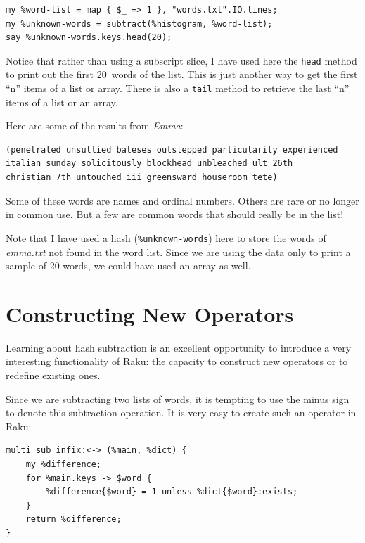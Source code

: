 \begin{verbatim}
my %word-list = map { $_ => 1 }, "words.txt".IO.lines;
my %unknown-words = subtract(%histogram, %word-list);
say %unknown-words.keys.head(20);
\end{verbatim}
%
Notice that rather than using a subscript slice, I have used 
here the {\tt head} method to print out the first 20~words of 
the list. This is just another way to get the first ``n'' items 
of a list or array. There is also a {\tt tail} method to 
retrieve the last ``n'' items of a list or an array.

Here are some of the results from {\em Emma}:

\begin{verbatim}
(penetrated unsullied bateses outstepped particularity experienced 
italian sunday solicitously blockhead unbleached ult 26th 
christian 7th untouched iii greensward houseroom tete)
\end{verbatim}
%
Some of these words are names and ordinal numbers.  Others 
are rare or no longer in common use.  But a few are common
words that should really be in the list!

Note that I have used a hash (\verb'%unknown-words') here to 
store the words of \emph{emma.txt} not found in the word list. 
Since we are using the data only to print a sample of 20 words, 
we could have used an array as well.

\section{Constructing New Operators}

\label{operator_construction}

Learning about hash subtraction is an excellent 
opportunity to introduce a very interesting functionality of 
Raku: the capacity to construct new operators or to 
redefine existing ones.

Since we are subtracting two lists of words, it is tempting to 
use the minus sign to denote this subtraction operation. It  
is very easy to create such an operator in Raku:

\begin{verbatim}
multi sub infix:<-> (%main, %dict) {
	my %difference;
	for %main.keys -> $word {
		%difference{$word} = 1 unless %dict{$word}:exists;
	}
	return %difference;
}
\end{verbatim}

